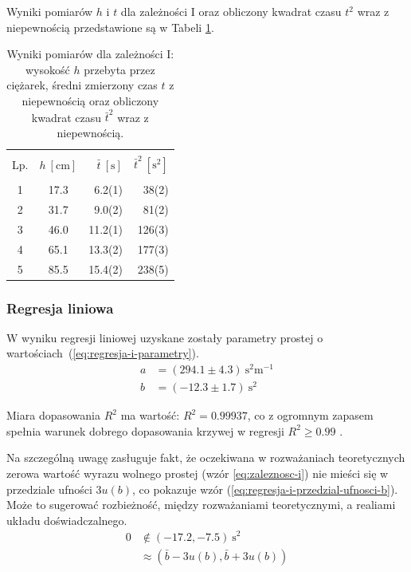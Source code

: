 \documentclass[twocolumn, a4paper, polish, 10pt]{article}
\begin{document}
Wyniki pomiarów $h$ i $t$ dla zależności I oraz obliczony kwadrat czasu $t^2$ wraz z niepewnością przedstawione są w Tabeli \ref{tab:zaleznosc-i}.
\begin{table}[ht]
\begin{center}
\renewcommand*{\tablename}{Tabela}
\caption{\small Wyniki pomiarów dla zależności I: wysokość $h$ przebyta przez ciężarek, średni zmierzony czas $t$ z niepewnością oraz obliczony kwadrat czasu $\bar{t}^2$ wraz z niepewnością.\vspace{0.15cm}
    \label{tab:zaleznosc-i}}
    {\small
    \begin{tabular}{c c r r}
    \hline \vspace{-0.35cm} \\
      Lp. & $h~[\mathrm{cm}]$ & $\bar{t}~[\mathrm{s}]$ & $\bar{t}^2~[\mathrm{s^2}]$ \\ 
      \hline \vspace{-0.2cm} \\
     1 & 17.3 & 6.2(1) & 38(2) \\
     2 & 31.7 & 9.0(2) & 81(2) \\
     3 & 46.0 & 11.2(1) & 126(3) \\
     4 & 65.1 & 13.3(2) & 177(3) \\
     5 & 85.5 & 15.4(2) & 238(5) \\
    \hline
    \end{tabular}}
    \end{center}
\end{table}

\subsubsection{Regresja liniowa}
W wyniku regresji liniowej uzyskane zostały parametry prostej o wartościach~(\ref{eq:regresja-i-parametry}).
\begin{equation}
\begin{split}
    a &= (294.1 \pm 4.3)~\mathrm{ s^2 m^{-1} } \\
    b &= (-12.3 \pm 1.7)~\mathrm{s^2}
    \label{eq:regresja-i-parametry}
\end{split}
\end{equation}

Miara dopasowania $R^2$ ma wartość: $R^2 = 0.99937$, co z ogromnym zapasem spełnia warunek dobrego dopasowania krzywej w regresji $R^2 \geq 0.99$ \cite{epa-8000d}.

Na szczególną uwagę zasługuje fakt, że oczekiwana w rozważaniach teoretycznych zerowa wartość wyrazu wolnego prostej (wzór \ref{eq:zaleznosc-i}) nie mieści się w przedziale ufności $3 u(b)$, co pokazuje wzór (\ref{eq:regresja-i-przedzial-ufnosci-b}). Może to sugerować rozbieżność, między rozważaniami teoretycznymi, a realiami układu doświadczalnego.
\begin{equation}
\begin{split}
    0 &\notin \left( -17.2, -7.5 \right)~\mathrm{s^2} \\
    &\approx \left( \bar{b} - 3 u(b), \bar{b} + 3 u(b) \right)
    \label{eq:regresja-i-przedzial-ufnosci-b}
\end{split}
\end{equation}
\end{document}
